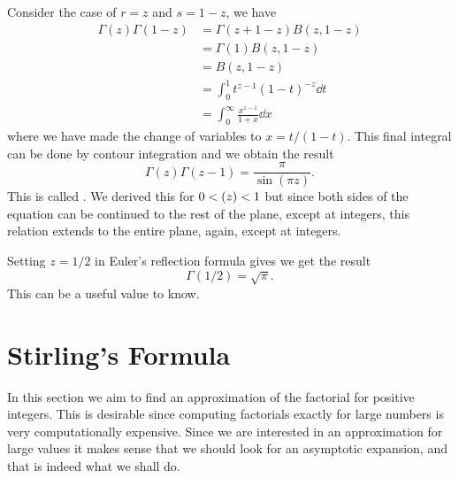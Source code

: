 \documentclass[fleqn]{NotesClass}
\let\Re\relax
\DeclareMathOperator{\Re}{Re}
\begin{document}
    Consider the case of \(r = z\) and \(s = 1 - z\), we have
    \begin{align}
        \Gamma(z)\Gamma(1 - z) &= \Gamma(z + 1 - z) B(z, 1 - z)\\
        &= \Gamma(1)B(z, 1 - z)\\
        &= B(z, 1 - z)\\
        &= \int_0^{1} t^{z-1}(1 - t)^{-z} \dd{t}\\
        &= \int_0^{\infty} \frac{x^{z-1}}{1 + x}\dd{x}
    \end{align}
    where we have made the change of variables to \(x = t/(1 - t)\).
    This final integral can be done by contour integration and we obtain the result
    \begin{equation}
        \Gamma(z)\Gamma(z-1) = \frac{\pi}{\sin(\pi z)}.
    \end{equation}
    This is called .
    We derived this for \(0 < \Re(z) < 1\) but since both sides of the equation can be continued to the rest of the plane, except at integers, this relation extends to the entire plane, again, except at integers.
    
    Setting \(z = 1/2\) in Euler's reflection formula gives we get the result
    \begin{equation}
        \Gamma(1/2) = \sqrt{\pi}.
    \end{equation}
    This can be a useful value to know.
    
    \section{Stirling's Formula}
    In this section we aim to find an approximation of the factorial for positive integers.
    This is desirable since computing factorials exactly for large numbers is very computationally expensive.
    Since we are interested in an approximation for large values it makes sense that we should look for an asymptotic expansion, and that is indeed what we shall do.
    
\end{document}
